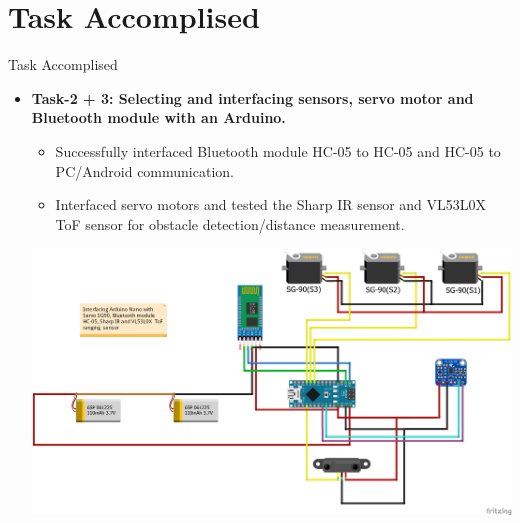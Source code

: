 \documentclass[10pt, a4paper]{beamer}
\begin{document}
\section{Task Accomplised}
\begin{frame}{Task Accomplised}
	\begin{itemize}
\item \textbf{Task-2 + 3: Selecting and interfacing sensors, servo motor and Bluetooth module with an Arduino.}
		\begin{itemize}
		  \item Successfully interfaced Bluetooth module HC-05 to HC-05 and HC-05 to PC/Android communication.
		  \item Interfaced servo motors and tested the Sharp IR sensor and VL53L0X ToF sensor for obstacle detection/distance measurement.
           \end{itemize}
           \centering\includegraphics[scale=0.2]{Arduino_interfacing.png}
	\end{itemize}
\end{frame}
\end{document}
